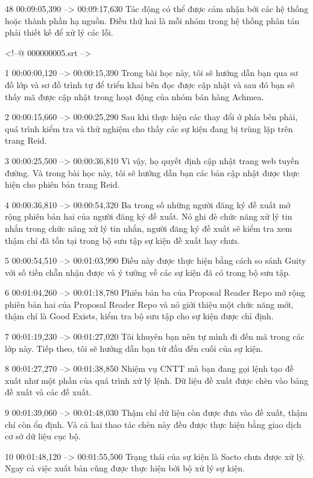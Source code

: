 48
00:09:05,390 --> 00:09:17,630
Tác động có thể được cảm nhận bởi các hệ thống hoặc thành phần hạ nguồn.  Điều thứ hai là mỗi nhóm trong hệ thống phân tán phải thiết kế để xử lý các lỗi.

<!--@ 000000005.srt -->

1
00:00:00,120 --> 00:00:15,390
Trong bài học này, tôi sẽ hướng dẫn bạn qua sơ đồ lớp và sơ đồ trình tự để triển khai bên đọc được cập nhật và sau đó bạn sẽ thấy mã được cập nhật trong hoạt động của nhóm bán hàng Achmea.

2
00:00:15,660 --> 00:00:25,290
Sau khi thực hiện các thay đổi ở phía bên phải, quá trình kiểm tra và thử nghiệm cho thấy các sự kiện đang bị trùng lặp trên trang Reid.

3
00:00:25,500 --> 00:00:36,810
Vì vậy, họ quyết định cập nhật trang web tuyến đường.  Và trong bài học này, tôi sẽ hướng dẫn bạn các bản cập nhật được thực hiện cho phiên bản trang Reid.

4
00:00:36,810 --> 00:00:54,320
Ba trong số những người đăng ký đề xuất mở rộng phiên bản hai của người đăng ký đề xuất.  Nó ghi đè chức năng xử lý tin nhắn trong chức năng xử lý tin nhắn, người đăng ký đề xuất sẽ kiểm tra xem thậm chí đã tồn tại trong bộ sưu tập sự kiện đề xuất hay chưa.

5
00:00:54,510 --> 00:01:03,990
Điều này được thực hiện bằng cách so sánh Guity với số tiền chẵn nhận được và ý tưởng về các sự kiện đã có trong bộ sưu tập.

6
00:01:04,260 --> 00:01:18,780
Phiên bản ba của Proposal Reader Repo mở rộng phiên bản hai của Proposal Reader Repo và nó giới thiệu một chức năng mới, thậm chí là Good Exists, kiểm tra bộ sưu tập cho sự kiện được chỉ định.

7
00:01:19,230 --> 00:01:27,020
Tôi khuyên bạn nên tự mình đi đến mã trong các lớp này.  Tiếp theo, tôi sẽ hướng dẫn bạn từ đầu đến cuối của sự kiện.

8
00:01:27,270 --> 00:01:38,850
Nhiệm vụ CNTT mà bạn đang gọi lệnh tạo đề xuất như một phần của quá trình xử lý lệnh.  Dữ liệu đề xuất được chèn vào bảng đề xuất và các đề xuất.

9
00:01:39,060 --> 00:01:48,030
Thậm chí dữ liệu còn được đưa vào đề xuất, thậm chí còn ổn định.  Và cả hai thao tác chèn này đều được thực hiện bằng giao dịch cơ sở dữ liệu cục bộ.

10
00:01:48,120 --> 00:01:55,500
Trạng thái của sự kiện là Sacto chưa được xử lý.  Ngay cả việc xuất bản cũng được thực hiện bởi bộ xử lý sự kiện.

